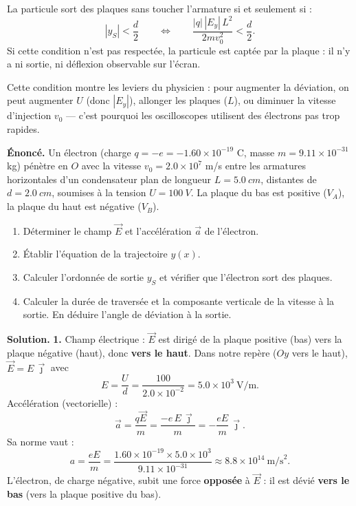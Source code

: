 \documentclass[11pt]{article}
\begin{document}
\begin{propriete}
La particule sort des plaques sans toucher l'armature si et seulement si :
\[ |y_S| < \frac{d}{2} \qquad \Longleftrightarrow \qquad \frac{|q|\,|E_y|\,L^2}{2mv_0^2} < \frac{d}{2}. \]
Si cette condition n'est pas respectée, la particule est captée par la plaque : il n'y a ni sortie, ni déflexion observable sur l'écran.
\end{propriete}

Cette condition montre les leviers du physicien : pour augmenter la déviation, on peut augmenter $U$ (donc $|E_y|$), allonger les plaques ($L$), ou diminuer la vitesse d'injection $v_0$ — c'est pourquoi les oscilloscopes utilisent des électrons pas trop rapides.

\begin{exoresolu}
\textbf{Énoncé.} Un électron (charge $q = -e = \num{-1,60}\times 10^{-19}$ C, masse $m = \num{9,11}\times 10^{-31}$ kg) pénètre en $O$ avec la vitesse $v_0 = \num{2,0}\times 10^{7}$ m/s entre les armatures horizontales d'un condensateur plan de longueur $L = \SI{5,0}{cm}$, distantes de $d = \SI{2,0}{cm}$, soumises à la tension $U = \SI{100}{V}$. La plaque du bas est positive ($V_A$), la plaque du haut est négative ($V_B$).
\begin{enumerate}
\item Déterminer le champ $\vec{E}$ et l'accélération $\vec{a}$ de l'électron.
\item Établir l'équation de la trajectoire $y(x)$.
\item Calculer l'ordonnée de sortie $y_S$ et vérifier que l'électron sort des plaques.
\item Calculer la durée de traversée et la composante verticale de la vitesse à la sortie. En déduire l'angle de déviation à la sortie.
\end{enumerate}
\tcblower
\textbf{Solution.}
\textbf{1.} Champ électrique : $\vec{E}$ est dirigé de la plaque positive (bas) vers la plaque négative (haut), donc \textbf{vers le haut}. Dans notre repère ($Oy$ vers le haut), $\vec{E} = E\,\vec{\jmath}$ avec
\[ E = \frac{U}{d} = \frac{100}{\num{2,0}\times 10^{-2}} = \num{5,0}\times 10^{3}\ \text{V/m}. \]
Accélération (vectorielle) :
\[ \vec{a} = \frac{q\vec{E}}{m} = \frac{-e\,E\,\vec{\jmath}}{m} = -\frac{eE}{m}\,\vec{\jmath}. \]
Sa norme vaut :
\[ a = \frac{eE}{m} = \frac{\num{1,60}\times 10^{-19}\times \num{5,0}\times 10^{3}}{\num{9,11}\times 10^{-31}} \approx \num{8,8}\times 10^{14}\ \text{m/s}^2. \]
L'électron, de charge négative, subit une force \textbf{opposée} à $\vec{E}$ : il est dévié \textbf{vers le bas} (vers la plaque positive du bas).


\end{exoresolu}
\end{document}

